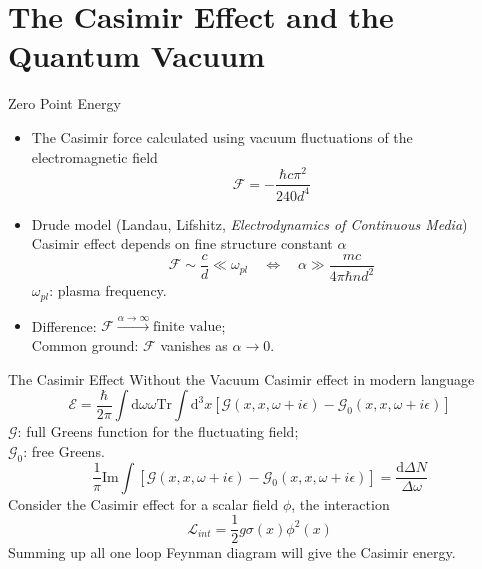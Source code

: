 \documentclass{beamer}
\begin{document}
\section{The Casimir Effect and the Quantum Vacuum}
\begin{frame}{Zero Point Energy}
    \begin{itemize}
        \item The Casimir force calculated using vacuum fluctuations of the electromagnetic field
        \begin{equation*}
            \mathcal{F}=-\frac{\hbar c\pi^2}{240d^4}
        \end{equation*}
        \item Drude model {\color{blue}(Landau, Lifshitz, \textit{Electrodynamics of Continuous Media})}\\
        Casimir effect depends on fine structure constant $\alpha$
        \begin{equation*}
            \mathcal{F}\sim \frac{c}{d}\ll\omega_{pl}\quad \Longleftrightarrow\quad \alpha\gg\frac{mc}{4\pi\hbar n d^2}
        \end{equation*}
        $\omega_{pl}$: plasma frequency.
        \item Difference: $\mathcal{F}\stackrel{\alpha\to\infty}{\longrightarrow}\text{finite value}$;\\
        Common ground: $\mathcal{F}$ vanishes as $\alpha\to0$.
    \end{itemize}
\end{frame}
\begin{frame}{The Casimir Effect Without the Vacuum\normalsize{\color{blue}{ ('05 Jaffe)}}}
    Casimir effect in modern language
    \begin{equation*}
        \mathcal{E}=\frac{\hbar}{2\pi}\int\mathrm{d}\omega\omega\mathrm{Tr}\int\mathrm{d}^3x[\mathcal{G}(x,x,\omega+i\epsilon)-\mathcal{G}_0(x,x,\omega+i\epsilon)]
    \end{equation*}
    $\mathcal{G}$: full Greens function for the fluctuating field;\\
    $\mathcal{G}_0$: free Greens.
    \begin{equation*}
        \frac{1}{\pi}\mathrm{Im}\int[\mathcal{G}(x,x,\omega+i\epsilon)-\mathcal{G}_0(x,x,\omega+i\epsilon)]=\frac{\mathrm{d}\Delta N}{\Delta \omega}
    \end{equation*}
    Consider the Casimir effect for a scalar field $\phi$, the interaction
    \begin{equation*}
        \mathcal{L}_{int}=\frac{1}{2}g\sigma(x)\phi^2(x)
    \end{equation*}
    Summing up all one loop Feynman diagram will give the Casimir energy.
\end{frame}
\end{document}

